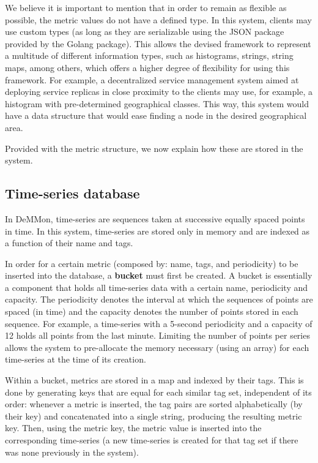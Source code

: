 We believe it is important to mention that in order to remain as flexible as possible, the metric values do not have a defined type. In this system, clients may use custom types (as long as they are serializable using the JSON package provided by the Golang \cite{golang} package). This allows the devised framework to represent a multitude of different information types, such as histograms, strings, string maps, among others, which offers a higher degree of flexibility for using this framework. For example, a decentralized service management system aimed at deploying service replicas in close proximity to the clients may use, for example, a histogram with pre-determined geographical classes. This way, this system would have a data structure that would ease finding a node in the desired geographical area.

Provided with the metric structure, we now explain how these are stored in the system. 

\subsection{Time-series database}  \label{sec:mon_module:tsdb}

In DeMMon, time-series are sequences taken at successive equally spaced points in time. In this system, time-series are stored only in memory and are indexed as a function of their name and tags.

In order for a certain metric (composed by: name, tags, and periodicity) to be inserted into the database, a \textbf{bucket} must first be created. A bucket is essentially a component that holds all time-series data with a certain name, periodicity and capacity. The periodicity denotes the interval at which the sequences of points are spaced (in time) and the capacity denotes the number of points stored in each sequence. For example, a time-series with a 5-second periodicity and a capacity of 12 holds all points from the last minute. Limiting the number of points per series allows the system to pre-allocate the memory necessary (using an array) for each time-series at the time of its creation.

Within a bucket, metrics are stored in a map and indexed by their tags. This is done by generating keys that are equal for each similar tag set, independent of its order: whenever a metric is inserted, the tag pairs are sorted alphabetically (by their key) and concatenated into a single string, producing the resulting metric key. Then, using the metric key, the metric value is inserted into the corresponding time-series (a new time-series is created for that tag set if there was none previously in the system).

